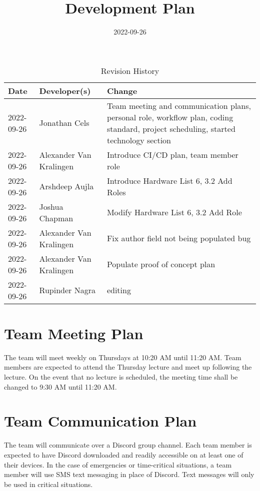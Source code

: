 \documentclass{article}
\title{Development Plan\\\progname}
\author{\authname}
\date{2022-09-26}
\begin{document}
\begin{table}[hp]
\caption{Revision History} \label{TblRevisionHistory}
\begin{tabularx}{\textwidth}{llX}
\toprule
\textbf{Date} & \textbf{Developer(s)} & \textbf{Change}\\
\midrule
2022-09-26 & Jonathan Cels & Team meeting and communication plans, personal role, workflow plan, coding standard, project scheduling, started technology section\\
2022-09-26 & Alexander Van Kralingen & Introduce CI/CD plan, team member role\\
2022-09-26 & Arshdeep Aujla & Introduce Hardware List 6, 3.2 Add Roles\\
2022-09-26 & Joshua Chapman & Modify Hardware List 6, 3.2 Add Role\\
2022-09-26 & Alexander Van Kralingen & Fix author field not being populated bug\\
2022-09-26 & Alexander Van Kralingen & Populate proof of concept plan\\
2022-09-26 & Rupinder Nagra & editing\\
\bottomrule
\end{tabularx}
\end{table}

\newpage

\maketitle

\section{Team Meeting Plan}
{The team will meet weekly on Thursdays at 10:20 AM until 11:20 AM. 
Team members are expected to attend the Thursday lecture and meet up following the lecture. 
On the event that no lecture is scheduled, the meeting time shall be changed to 9:30 AM until 11:20 AM.}

\medskip
{}

\section{Team Communication Plan}
{The team will communicate over a Discord group channel. Each team member is expected to have Discord downloaded and readily accessible on at least one of their devices. 
In the case of emergencies or time-critical situations, a team member will use SMS text messaging in place of Discord. Text messages will only be used in critical situations.}
\end{document}
